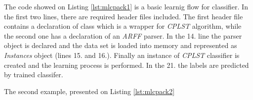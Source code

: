 The code showed on Listing \ref{lst:mlcpack1} is a basic learnig flow for classifier. In the first two lines, there are required header files included. The first header file contains a declaration of class which is a wrapper for \textit{CPLST} algorithm, while the second one has a declaration of an \textit{ARFF} parser. In the 14. line the parser object is declared and the data set is loaded into memory and represented as \textit{Instances} object (lines 15. and 16.). Finally an instance of \textit{CPLST} classifier is created and the learning process is performed. In the 21. the labels are predicted by trained classifer.



The second example, presented on Listing \ref{lst:mlcpack2}  



